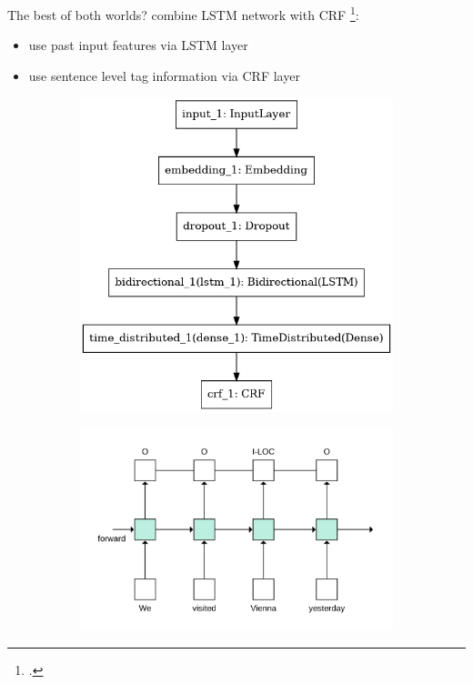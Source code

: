 \documentclass[12pt, tikz]{beamer}
\begin{document}
\begin{frame}[fragile]{The best of both worlds?}
	combine LSTM network with CRF  \footcite{huang2015bidirectional}:
	\begin{itemize}
		\item<1-> use past input features via LSTM layer
		\item<2-> use sentence level tag information via CRF layer
	\end{itemize}
	\pause
	\vspace{-0.2cm}
	
	\centering
	\begin{figure}
		\centering
		\begin{subfigure}{.5\textwidth}
			\centering
			\includegraphics[width=\linewidth]{img/lstm_crf_model.png}
		\end{subfigure}%
		\begin{subfigure}{.5\textwidth}
			\centering
			\includegraphics[width=\linewidth]{img/lstm_crf_overview.png}
		\end{subfigure}
		
	\end{figure}

	
\end{frame}
\end{document}
